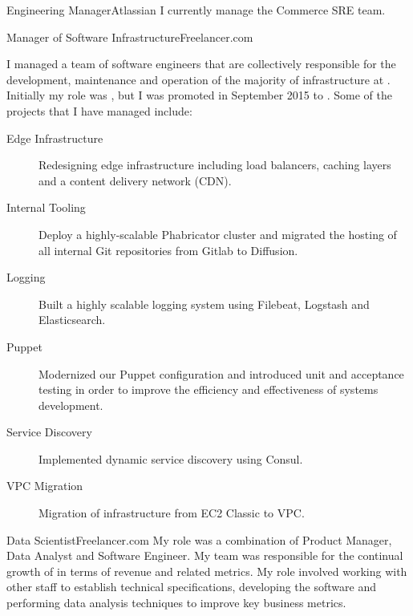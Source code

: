 \begin{professionalExperience}

{Engineering Manager}{Atlassian}
{I currently manage the Commerce SRE team.}

{Manager of Software Infrastructure}{Freelancer.com}
{
  I managed a team of software engineers that are collectively
  responsible for the development, maintenance and operation of the majority of
  infrastructure at . Initially my role was
  , but I was promoted in September
  2015 to . Some of the projects
  that I have managed include:

  \begin{description}
    \item[Edge Infrastructure] Redesigning edge infrastructure including load
      balancers, caching layers and a content delivery network (CDN).
    \item[Internal Tooling] Deploy a highly-scalable Phabricator cluster and
      migrated the hosting of all internal Git repositories from Gitlab to
      Diffusion.
    \item[Logging] Built a highly scalable logging system using Filebeat,
      Logstash and Elasticsearch.
    \item[Puppet] Modernized our Puppet configuration and introduced unit and
      acceptance testing in order to improve the efficiency and effectiveness of
      systems development.
    \item[Service Discovery] Implemented dynamic service discovery using Consul.
    \item[VPC Migration] Migration of infrastructure from EC2 Classic to VPC\@.
  \end{description}
}

{Data Scientist}{Freelancer.com}
{
  My role was a combination of Product Manager, Data Analyst and Software
  Engineer. My team was responsible for the continual growth of
   in terms of revenue and related metrics. My role
  involved working with other staff to establish technical specifications,
  developing the software and performing data analysis techniques to improve key
  business metrics.
}

\end{professionalExperience}

